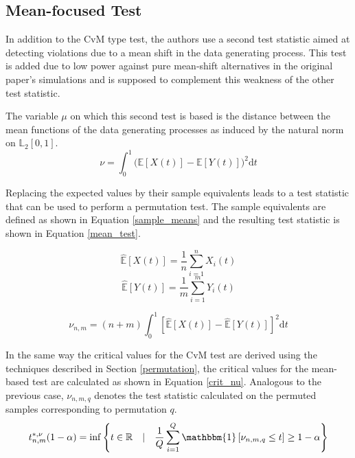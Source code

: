 \documentclass[12pt, a4paper]{article}
\theoremstyle{MAstyle} \newtheorem{assumption}{Assumption}[section]
\theoremstyle{MAstyle} \newtheorem{definition}{Definition}[section]
\theoremstyle{MAstyle} \newtheorem{theorem}{Theorem}[section]
\begin{document}
		\subsection{Mean-focused Test}\label{mean_based_test}
			In addition to the CvM type test, the authors use a second test statistic aimed at detecting violations due to a mean shift in the data generating process. This test is added due to low power against pure mean-shift alternatives in the original paper's simulations and is supposed to complement this weakness of the other test statistic.
			
			The variable $\mu$ on which this second test is based is the distance between the mean functions of the data generating processes as induced by the natural norm on $\mathbb{L}_2[0,1]$.
			\begin{equation}
				\nu = \int_{0}^{1} \big(\mathbb{E}\left[X(t)\right] - \mathbb{E}\left[Y(t)\right]\big)^2 \mathrm{d}t
			\end{equation}
		
			Replacing the expected values by their sample equivalents leads to a test statistic that can be used to perform a permutation test. The sample equivalents are defined as shown in Equation \ref{sample_means} and the resulting test statistic is shown in Equation \ref{mean_test}.
			\begin{multicols}{2}
				\noindent
				\begin{equation*}
					\hat{\mathbb{E}}\left[X(t)\right] = \frac{1}{n}\sum_{i = 1}^{n} X_i(t)
				\end{equation*}
				\begin{equation}\label{sample_means}
					\hat{\mathbb{E}}\left[Y(t)\right] = \frac{1}{m}\sum_{i = 1}^{m} Y_i(t)
				\end{equation}
			\end{multicols}
			\begin{equation}\label{mean_test}
				\nu_{n,m} = (n+m) \int_{0}^{1} \left[\hat{\mathbb{E}}\left[X(t)\right] - \hat{\mathbb{E}}\left[Y(t)\right] \right]^2 \mathrm{d}t
			\end{equation}
		
			In the same way the critical values for the CvM test are derived using the techniques described in Section \ref{permutation}, the critical values for the mean-based test are calculated as shown in Equation \ref{crit_nu}. Analogous to the previous case, $\nu_{n,m,q}$ denotes the test statistic  calculated on the permuted samples corresponding to permutation $q$.
			\begin{equation}\label{crit_nu}
				t^{*, \nu}_{n,m}(1-\alpha) = \inf \left\{t \in \mathbb{R} \quad \vert \quad \frac{1}{Q} \sum_{i = 1}^{Q} \mathbbm{1}\left[\nu_{n,m,q} \leq t\right] \geq 1 - \alpha \right\}
			\end{equation}
		
\end{document}
